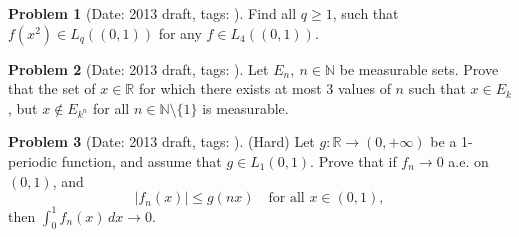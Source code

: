 \documentclass[11pt, notitlepage]{article}
\theoremstyle{definition}
\theoremstyle{definition}
\theoremstyle{definition}
\newtheorem{probstate}{Problem}
\theoremstyle{remark}
\newenvironment{problem}[2]{
    \begin{probstate}[Date: #1, tags: {\color{white} \texttt{#2}}]
}
{
  \end{probstate}
}
\newcommand{\R}{\mathbb{R}}
\newcommand{\N}{\mathbb{N}}
\begin{document}
\begin{problem}{2013 draft}{}
Find all $q \ge 1$, such that $f(x^2) \in L_q((0,1))$ for any $f  \in L_4((0,1))$.
\end{problem}

\begin{problem}{2013 draft}{}
Let $E_n, \ n \in \N$ be measurable sets. Prove that the set of $x \in \R$ for which there exists at most 3 values of $n$ such that $x \in E_k$, but $x \notin E_{k^n}$ for all $n \in \N \setminus \{1\}$ is measurable.
\end{problem}

\begin{problem}{2013 draft}{}
(Hard) Let $g: \R \to (0,+\infty)$ be a 1-periodic function, and assume that $g \in L_1(0,1)$. Prove that if $f_n \to 0$ a.e. on $(0,1)$, and
    \[
     |f_n(x)| \le g(nx) \quad \text{for all } x \in (0,1),
    \]
    then $\int_0^1f_n (x) \, dx \to 0$.
\end{problem}
\end{document}
